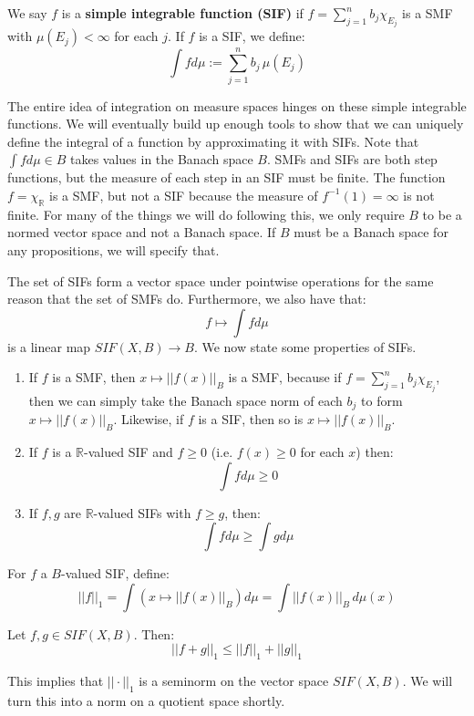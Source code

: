 	\begin{definition}
		We say $f$ is a \textbf{simple integrable function (SIF)} if $f = \sum_{j = 1}^nb_j\chi_{E_j}$ is a SMF with 
		$\mu(E_j) < \infty$ for each $j$. If $f$ is a SIF, we define:
		$$
			\int fd\mu := \sum_{j = 1}^nb_j \, \mu(E_j)
		$$
	\end{definition}
	
	The entire idea of integration on measure spaces hinges on these simple integrable functions. We will eventually 
	build up enough tools to show that we can uniquely define the integral of a function by approximating it with SIFs. 
	Note that $\int fd\mu\in B$ takes values in the Banach space $B$. SMFs and SIFs are both step functions, but the 
	measure of each step in an SIF must be finite. The function $f = \chi_{\mathbb R}$ is a SMF, but not a SIF because 
	the measure of $f^{-1}(1) = \infty$ is not finite. For many of the things we will do following this, we only require $B$ to 
	be a normed vector space and not a Banach space. If $B$ must be a Banach space for any propositions, we will specify 
	that. 
	
	The set of SIFs form a vector space under pointwise operations for the same reason that the set of SMFs do. 
	Furthermore, we also have that:
	$$
		f\mapsto\int fd\mu
	$$
	is a linear map $SIF(X, B)\rightarrow B$. We now state some properties of SIFs.
	
	\begin{enumerate}
		\item If $f$ is a SMF, then $x\mapsto ||f(x)||_B$ is a SMF, because if $f = \sum_{j = 1}^n b_j\chi_{E_j}$, then 
		we can simply take the Banach space norm of each $b_j$ to form $x\mapsto ||f(x)||_B$. Likewise, if $f$ is a 
		SIF, then so is $x\mapsto ||f(x)||_B$.
		
		\item If $f$ is a $\mathbb R$-valued SIF and $f\geq 0$ (i.e. $f(x)\geq 0$ for each $x$) then:
		$$
			\int fd\mu\geq 0
		$$
		
		\item If $f, g$ are $\mathbb R$-valued SIFs with $f\geq g$, then:
		$$
			\int fd\mu\geq\int gd\mu
		$$
	\end{enumerate}
	
	For $f$ a $B$-valued SIF, define:
	$$
		||f||_1 = \int (x\mapsto ||f(x)||_B)d\mu = \int ||f(x)||_B \, d\mu(x)
	$$
	\begin{prop}
		Let $f, g\in SIF(X, B)$. Then:
		$$
			||f + g||_1\leq ||f||_1 + ||g||_1
		$$
	\end{prop}
	This implies that $||\cdot||_1$ is a seminorm on the vector space $SIF(X, B)$. We will turn this into a norm on a 
	quotient space shortly. 
	
